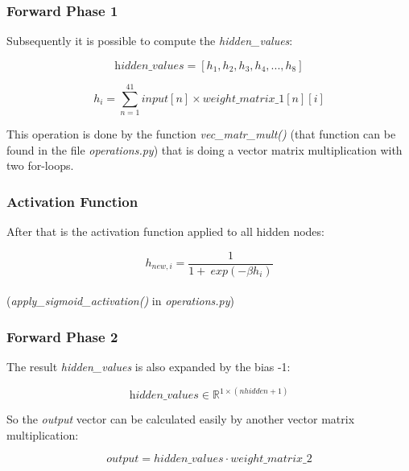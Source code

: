 \documentclass[10pt,a4paper]{article}
\begin{document}
	\subsubsection{Forward Phase 1}
	Subsequently it is possible to compute the \textit{hidden\_values}:
	\begin{center}
		\begin{equation}
		\textit{hidden\_values} = [h_1,h_2,h_3,h_4,...,h_8]
		\end{equation} 
	\end{center}

	\begin{center}
		\begin{equation}
		h_i = \sum_{n=1}^{41} input[n] \times weight\_matrix\_1[n][i] 
		\end{equation} 
	\end{center}
	This operation is done by the function \textit{ vec\_matr\_mult()} (that function can be found in the file \textit{operations.py}) that is doing a vector matrix multiplication with two for-loops. \\
	\subsubsection{Activation Function}
	After that is the activation function applied to all hidden nodes:
	\begin{center}
		\begin{equation}
		h_{new, i} = \frac{1}{1 + \ exp(-\beta h_i)} 
		\end{equation} 
		\\ (\textit{apply\_sigmoid\_activation()} in \textit{operations.py})
	\end{center}
	\subsubsection{Forward Phase 2}
	The result \textit{hidden\_values} is also expanded by the bias -1: 
	\begin{center}
		\begin{equation}
		\textit{hidden\_values} \in \mathbb{R}^{1\times (nhidden +1)} 
		\end{equation} 
	\end{center}
	 So the \textit{output} vector can be calculated easily by another vector matrix multiplication:
	  \begin{center}
	  	\begin{equation}
	  	\textit{output} = hidden\_values \cdot weight\_matrix\_2 
	  	\end{equation} 
	  \end{center}
\end{document}
